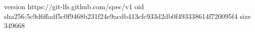 version https://git-lfs.github.com/spec/v1
oid sha256:5c9d6ffadf5c0f9468b231f24e9acdb413cfc933d2db0f493338614f720095f4
size 349668
